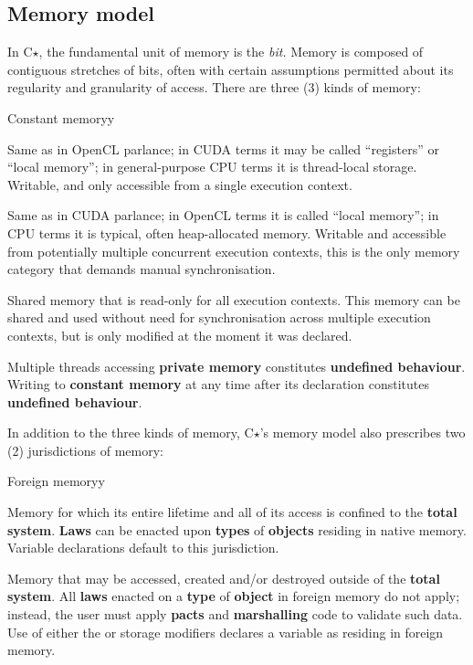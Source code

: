 \documentclass[12pt,english]{article}
\renewcommand{\texttt}[1]{\ttfamily{\small{#1}}\normalfont{}}
\begin{document}
\subsection{Memory model}
\label{s-language-memory_model}

In C$\star$, the fundamental unit of memory is the \textit{bit.} Memory is
composed of contiguous stretches of bits, often with certain assumptions
permitted about its regularity and granularity of access. There are three (3)
kinds of memory:

\begin{labeling}{Constant memoryy}
\item [\textbf{Private memory}] Same as in OpenCL parlance; in CUDA terms it
may be called ``registers'' or ``local memory''; in general-purpose CPU terms
it is thread-local storage. Writable, and only accessible from a single
execution context.
\item [\textbf{Shared memory}] Same as in CUDA parlance; in OpenCL terms it is
called ``local memory''; in CPU terms it is typical, often heap-allocated
memory. Writable and accessible from potentially multiple concurrent execution
contexts, this is the only memory category that demands manual
synchronisation.
\item [\textbf{Constant memory}] Shared memory that is read-only for all
execution contexts. This memory can be shared and used without need for
synchronisation across multiple execution contexts, but is only modified at
the moment it was declared.
\end{labeling}

Multiple threads accessing \textbf{private memory} constitutes
\textbf{undefined behaviour}. Writing to \textbf{constant memory} at any time
after its declaration constitutes \textbf{undefined behaviour}.

In addition to the three kinds of memory, C$\star$'s memory model also
prescribes two (2) jurisdictions of memory:

\begin{labeling}{Foreign memoryy}
\item [\textbf{Native memory}] Memory for which its entire lifetime and all of
its access is confined to the \textbf{total system}. \textbf{Laws} can be
enacted upon \textbf{types} of \textbf{objects} residing in native memory.
Variable declarations default to this jurisdiction.
\item [\textbf{Foreign memory}] Memory that may be accessed, created and/or
destroyed outside of the \textbf{total system}. All \textbf{laws} enacted on a
\textbf{type} of \textbf{object} in foreign memory do not apply; instead, the
user must apply \textbf{pacts} and \textbf{marshalling} code to validate such
data. Use of either the \texttt{extern} or \texttt{volatile} storage modifiers
declares a variable as residing in foreign memory.
\end{labeling}
\end{document}

